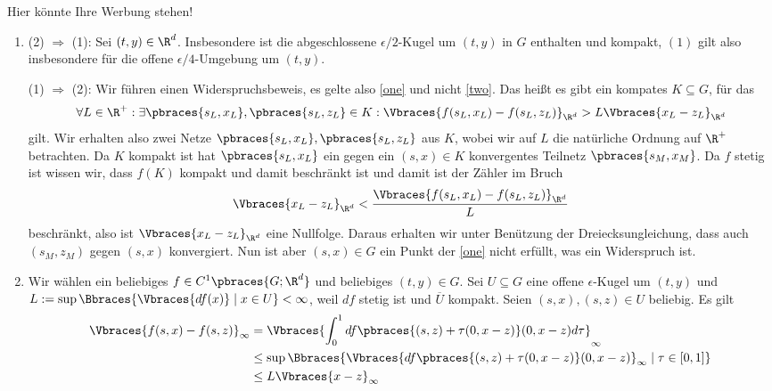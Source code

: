 \begin{solution}
  Hier könnte Ihre Werbung stehen!

  \begin{enumerate}[label = \alph*)]
    \item
    (2) $\Rightarrow$ (1): Sei $(t, y) \in \R^d$.
    Insbesondere ist die abgeschlossene $\epsilon /2$-Kugel um $(t,y)$ in $G$ enthalten und kompakt, $(1)$ gilt also insbesondere für die offene $\epsilon /4$-Umgebung um $(t,y)$.

    (1) $\Rightarrow$ (2):
    Wir führen einen Widerspruchsbeweis, es gelte also \ref{one} und nicht \ref{two}. Das heißt es gibt ein kompates $K \subseteq G$, für das
    \begin{align*}
      \forall L \in \R^+: \exists \pbraces{s_L,x_L}, \pbraces{s_L, z_L} \in K: \Vbraces{f(s_L,x_L) - f(s_L,z_L)}_{\R^d} > L \Vbraces{x_L - z_L}_{\R^d}
    \end{align*}
    gilt. Wir erhalten also zwei Netze $\pbraces{s_L,x_L}, \pbraces{s_L, z_L}$ aus $K$, wobei wir auf $L$ die natürliche Ordnung auf $\R^+$ betrachten. Da $K$ kompakt ist hat $\pbraces{s_L,x_L}$ ein gegen ein $(s,x) \in K$ konvergentes Teilnetz $\pbraces{s_M, x_M}$. Da $f$ stetig ist wissen wir, dass $f(K)$ kompakt und damit beschränkt ist und damit ist der Zähler im Bruch
    \begin{align*}
      \Vbraces{x_L - z_L}_{\R^d} < \frac{\Vbraces{f(s_L,x_L) - f(s_L,z_L)}_{\R^d}}{L}
    \end{align*}
    beschränkt, also ist $\Vbraces{x_L - z_L}_{\R^d}$ eine Nullfolge. Daraus erhalten wir unter Benützung der Dreiecksungleichung, dass auch $(s_M,z_M)$ gegen $(s,x)$ konvergiert. Nun ist aber $(s,x) \in G$ ein Punkt der \ref{one} nicht erfüllt, was ein Widerspruch ist.

    \item Wir wählen ein beliebiges $f \in C^1\pbraces{G; \R^d}$ und beliebiges $(t,y) \in G$. Sei $U \subseteq G$ eine offene $\epsilon$-Kugel um $(t,y)$ und $L := \sup\Bbraces{\Vbraces{df(x)} \mid x \in U } < \infty$, weil $df$ stetig ist und $\overline{U}$ kompakt. Seien $(s,x), (s,z) \in U$ beliebig. Es gilt
    \begin{align*}
      \Vbraces{f(s,x) - f(s,z)}_\infty &= \Vbraces{\int_0^1 df\pbraces{(s,z) + \tau (0, x - z)} (0, x - z) d\tau }_\infty \\
      &\leq \sup\Bbraces{ \Vbraces{df\pbraces{(s,z) + \tau (0, x - z)} (0, x - z)}_\infty \mid \tau \in [0,1] } \\
      &\leq L \Vbraces{x - z}_\infty
    \end{align*}


\end{enumerate}
\end{solution}
